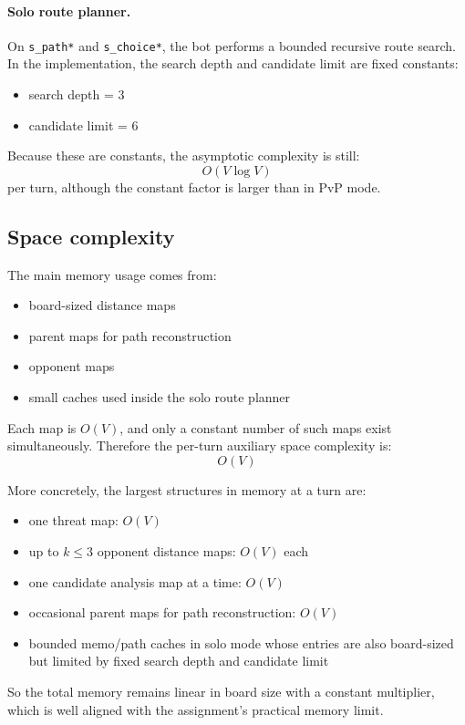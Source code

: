 \documentclass[11pt,a4paper]{article}
\begin{document}
\paragraph{Solo route planner.}
On \texttt{s\_path*} and \texttt{s\_choice*}, the bot performs a bounded recursive route search. In the implementation, the search depth and candidate limit are fixed constants:
\begin{itemize}[leftmargin=*]
    \item search depth = \(3\)
    \item candidate limit = \(6\)
\end{itemize}

Because these are constants, the asymptotic complexity is still:
\[
O(V \log V)
\]
per turn, although the constant factor is larger than in PvP mode.

\subsection{Space complexity}
The main memory usage comes from:
\begin{itemize}[leftmargin=*]
    \item board-sized distance maps
    \item parent maps for path reconstruction
    \item opponent maps
    \item small caches used inside the solo route planner
\end{itemize}

Each map is \(O(V)\), and only a constant number of such maps exist simultaneously. Therefore the per-turn auxiliary space complexity is:
\[
O(V)
\]

More concretely, the largest structures in memory at a turn are:
\begin{itemize}[leftmargin=*]
    \item one threat map: \(O(V)\)
    \item up to \(k \le 3\) opponent distance maps: \(O(V)\) each
    \item one candidate analysis map at a time: \(O(V)\)
    \item occasional parent maps for path reconstruction: \(O(V)\)
    \item bounded memo/path caches in solo mode whose entries are also board-sized but limited by fixed search depth and candidate limit
\end{itemize}
So the total memory remains linear in board size with a constant multiplier, which is well aligned with the assignment's practical memory limit.
\end{document}
